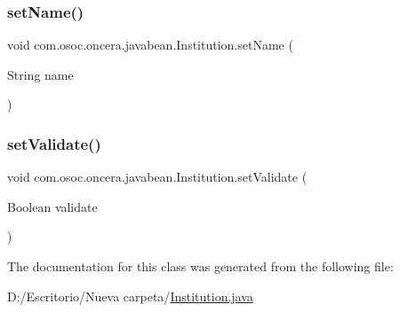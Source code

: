 \mbox{\label{classcom_1_1osoc_1_1oncera_1_1javabean_1_1_institution_af98082aec13a0adfbd229b6af2462bab}} 
\subsubsection{\texorpdfstring{setName()}{setName()}}
{\footnotesize\ttfamily void com.\+osoc.\+oncera.\+javabean.\+Institution.\+set\+Name (\begin{DoxyParamCaption}\item[{String}]{name }\end{DoxyParamCaption})}

\mbox{\label{classcom_1_1osoc_1_1oncera_1_1javabean_1_1_institution_a9f1ba1b37a9383631742641c07a54cff}} 
\subsubsection{\texorpdfstring{setValidate()}{setValidate()}}
{\footnotesize\ttfamily void com.\+osoc.\+oncera.\+javabean.\+Institution.\+set\+Validate (\begin{DoxyParamCaption}\item[{Boolean}]{validate }\end{DoxyParamCaption})}



The documentation for this class was generated from the following file\+:\begin{DoxyCompactItemize}
\item 
D\+:/\+Escritorio/\+Nueva carpeta/\mbox{\hyperlink{_institution_8java}{Institution.\+java}}\end{DoxyCompactItemize}
